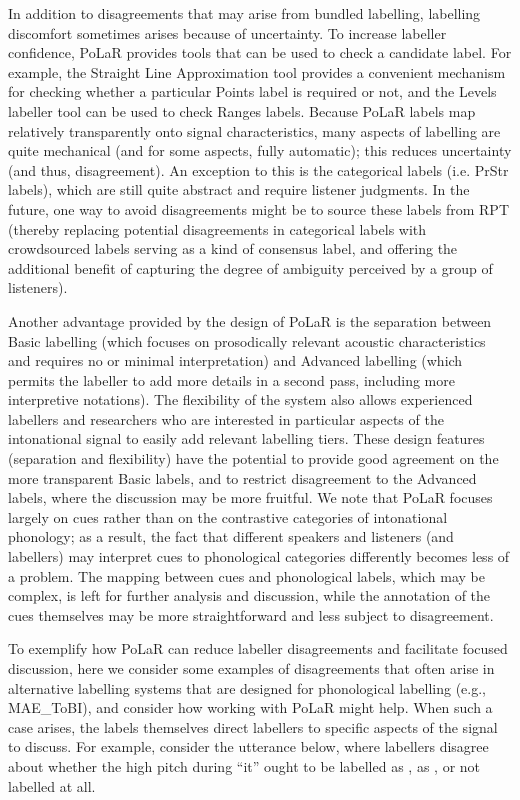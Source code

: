 \documentclass[11pt, twoside]{memoir}
\def\polar#1{{\relsize{-.5}\fontspec[Mapping=tex-text]{Roboto Mono}{#1}}}
\def\tobi#1{\polar{#1}}
\begin{document}
In addition to disagreements that may arise from bundled labelling, labelling discomfort sometimes arises because of uncertainty.  To increase labeller confidence, PoLaR provides tools that can be used to check a candidate label.  For example, the Straight Line Approximation tool provides a convenient mechanism for checking whether a particular Points label is required or not, and the Levels labeller tool can be used to check Ranges labels.  Because PoLaR labels map relatively transparently onto signal characteristics, many aspects of labelling are quite mechanical (and for some aspects, fully automatic); this reduces uncertainty (and thus, disagreement). An exception to this is the categorical labels (i.e. PrStr labels), which are still quite abstract and require listener judgments. In the future, one way to avoid disagreements might be to source these labels from RPT (thereby replacing potential disagreements in categorical labels with crowdsourced labels serving as a kind of consensus label, and offering the additional benefit of capturing the degree of ambiguity perceived by a group of listeners). 

Another advantage provided by the design of PoLaR is the separation between Basic labelling (which focuses on prosodically relevant acoustic characteristics and requires no or minimal interpretation) and Advanced labelling (which permits the labeller to add more details in a second pass, including more interpretive notations). The flexibility of the system also allows experienced labellers and researchers who are interested in particular aspects of the intonational signal to easily add relevant labelling tiers.  These design features (separation and flexibility) have the potential to provide good agreement on the more transparent Basic labels, and to restrict disagreement to the Advanced labels, where the discussion may be more fruitful.  We note that PoLaR focuses largely on cues rather than on the contrastive categories of intonational phonology; as a result, the fact that different speakers and listeners (and labellers) may interpret cues to phonological categories differently becomes less of a problem.  The mapping between cues and phonological labels, which may be complex, is left for further analysis and discussion, while the annotation of the cues themselves may be more straightforward and less subject to disagreement.

To exemplify how PoLaR can reduce labeller disagreements and facilitate focused discussion, here we consider some examples of disagreements that often arise in alternative labelling systems that are designed for phonological labelling (e.g., MAE\_ToBI), and consider how working with PoLaR might help. When such a case arises, the labels themselves direct labellers to specific aspects of the signal to discuss. For example, consider the utterance below, where labellers disagree about whether the high pitch during “it” ought to be labelled as \tobi{H*}, as \tobi{\%H}, or not labelled at all.
\end{document}
